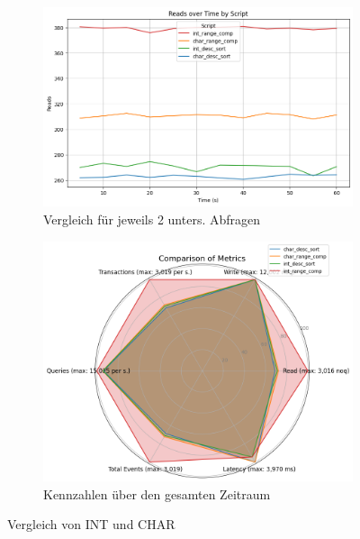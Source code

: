 \vspace{-15pt}
\begin{figure}[H]
    \centering
    \begin{subfigure}[t]{0.48\textwidth}
        \centering
        \includegraphics[width=\textwidth]{PNGs/Script/Data_Types/Simpler/int-char/Reads}
        \caption{Vergleich für jeweils 2 unters. Abfragen}
        \label{data-types-simpler-reads}
    \end{subfigure}
    \hfill
    \begin{subfigure}[t]{0.48\textwidth}
        \centering
        \includegraphics[width=\textwidth]{PNGs/Script/Data_Types/Simpler/int-char/statistics}
        \caption{Kennzahlen über den gesamten Zeitraum}
        \label{fig:data-types-simpler-statistics}
    \end{subfigure}
    \caption{Vergleich von INT und CHAR}
\end{figure}
\vspace{-20pt}

